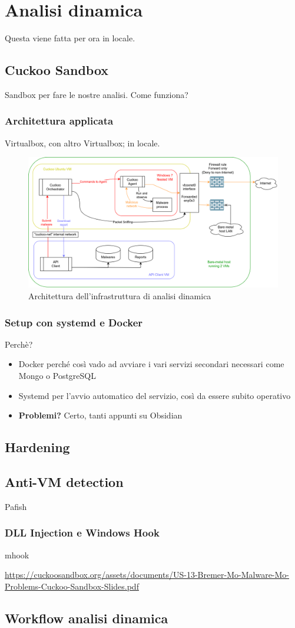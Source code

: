 \chapter{Analisi dinamica}

Questa viene fatta per ora in locale.

\section{Cuckoo Sandbox}
Sandbox per fare le nostre analisi.
Come funziona?

\subsection{Architettura applicata}
Virtualbox, con altro Virtualbox; in locale.

\begin{figure}[H]
    \centering
    \includegraphics[width=\textwidth]{assets/cuckoo_vms.png}
    \caption{Architettura dell'infrastruttura di analisi dinamica}
    \label{fig:cuckoo_vms_architecture}
\end{figure}

\subsection{Setup con systemd e Docker}
Perchè?
\begin{itemize}
    \item Docker perché così vado ad avviare i vari servizi secondari necessari come Mongo o PostgreSQL
    \item Systemd per l'avvio automatico del servizio, così da essere subito operativo
    \item \textbf{Problemi?} Certo, tanti appunti su Obsidian
\end{itemize}

\section{Hardening}

\section{Anti-VM detection}
Pafish

\subsection{DLL Injection e Windows Hook}
mhook

\url{https://cuckoosandbox.org/assets/documents/US-13-Bremer-Mo-Malware-Mo-Problems-Cuckoo-Sandbox-Slides.pdf}

\section{Workflow analisi dinamica}
